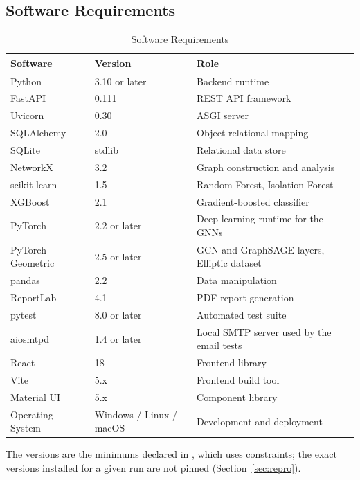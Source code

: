\subsection{Software Requirements}
\begin{table}[H]
\centering
\caption{Software Requirements}
\label{tab:software}
\small
\begin{tabularx}{\textwidth}{L{3.6cm}L{2.9cm}Y}
\toprule
\textbf{Software} & \textbf{Version} & \textbf{Role} \\
\midrule
Python            & 3.10 or later & Backend runtime \\
FastAPI           & 0.111         & REST API framework \\
Uvicorn           & 0.30          & ASGI server \\
SQLAlchemy        & 2.0           & Object-relational mapping \\
SQLite            & stdlib        & Relational data store \\
NetworkX          & 3.2           & Graph construction and analysis \\
scikit-learn      & 1.5           & Random Forest, Isolation Forest \\
XGBoost           & 2.1           & Gradient-boosted classifier \\
PyTorch           & 2.2 or later  & Deep learning runtime for the GNNs \\
PyTorch Geometric & 2.5 or later  & GCN and GraphSAGE layers, Elliptic dataset \\
pandas            & 2.2           & Data manipulation \\
ReportLab         & 4.1           & PDF report generation \\
pytest            & 8.0 or later  & Automated test suite \\
aiosmtpd          & 1.4 or later  & Local SMTP server used by the email tests \\
React             & 18            & Frontend library \\
Vite              & 5.x           & Frontend build tool \\
Material UI       & 5.x           & Component library \\
Operating System  & Windows / Linux / macOS & Development and deployment \\
\bottomrule
\end{tabularx}
\par\vspace{3pt}
\begin{minipage}{\textwidth}\footnotesize
The versions are the minimums declared in , which uses \code{>=} constraints; the exact versions installed for a given run are not pinned (Section~\ref{sec:repro}).
\end{minipage}
\end{table}

